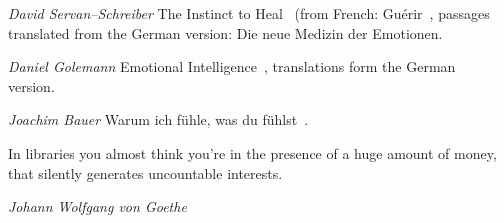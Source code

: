 \documentclass[../main.tex]{subfiles}
\begin{document}
\textit{David Servan--Schreiber} The Instinct to Heal~\cite{InstinctHealDSS} (from French: Gu{{\'e}}rir~\cite{GuerirDSS},
passages translated from the German version: Die neue Medizin der Emotionen.~\cite{MedEmotionen}

\noindent \textit{Daniel Golemann} Emotional Intelligence~\cite{EQ}, translations form the German version.~\cite{EQDE}

\noindent \textit{Joachim Bauer} Warum ich f\"uhle, was du f\"uhlst~\cite{BauerFuehlen}. 

  \epigraph{In libraries you almost think you're in the presence of a huge amount of money, that silently generates uncountable interests.}{\textit{Johann Wolfgang von Goethe}}
\end{document}
